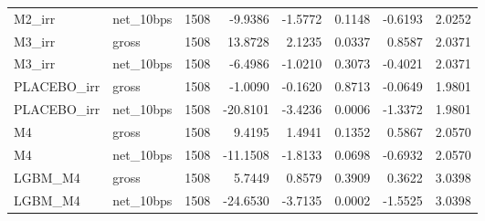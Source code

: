 \begin{tabular}{llrrrrrr}
M2\_irr & net\_10bps & 1508 & -9.9386 & -1.5772 & 0.1148 & -0.6193 & 2.0252 \\
M3\_irr & gross & 1508 & 13.8728 & 2.1235 & 0.0337 & 0.8587 & 2.0371 \\
M3\_irr & net\_10bps & 1508 & -6.4986 & -1.0210 & 0.3073 & -0.4021 & 2.0371 \\
PLACEBO\_irr & gross & 1508 & -1.0090 & -0.1620 & 0.8713 & -0.0649 & 1.9801 \\
PLACEBO\_irr & net\_10bps & 1508 & -20.8101 & -3.4236 & 0.0006 & -1.3372 & 1.9801 \\
M4 & gross & 1508 & 9.4195 & 1.4941 & 0.1352 & 0.5867 & 2.0570 \\
M4 & net\_10bps & 1508 & -11.1508 & -1.8133 & 0.0698 & -0.6932 & 2.0570 \\
LGBM\_M4 & gross & 1508 & 5.7449 & 0.8579 & 0.3909 & 0.3622 & 3.0398 \\
LGBM\_M4 & net\_10bps & 1508 & -24.6530 & -3.7135 & 0.0002 & -1.5525 & 3.0398 \\
\bottomrule
\end{tabular}
